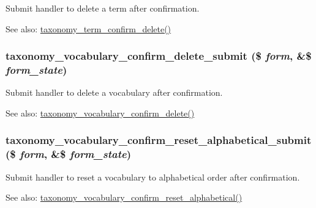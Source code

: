 Submit handler to delete a term after confirmation.

\begin{Desc}
\item[See also:]\hyperlink{group__forms_g409c50f3f4727ec2856079e7abb01eba}{taxonomy\_\-term\_\-confirm\_\-delete()} \end{Desc}
\hypertarget{taxonomy_8admin_8inc_37c587803cac8e509913d1374e897040}{
\subsubsection[{taxonomy\_\-vocabulary\_\-confirm\_\-delete\_\-submit}]{\setlength{\rightskip}{0pt plus 5cm}taxonomy\_\-vocabulary\_\-confirm\_\-delete\_\-submit (\$ {\em form}, \/  \&\$ {\em form\_\-state})}}
\label{taxonomy_8admin_8inc_37c587803cac8e509913d1374e897040}


Submit handler to delete a vocabulary after confirmation.

\begin{Desc}
\item[See also:]\hyperlink{group__forms_gc5c29e41ed1c0a05b4678e69aff1d947}{taxonomy\_\-vocabulary\_\-confirm\_\-delete()} \end{Desc}
\hypertarget{taxonomy_8admin_8inc_682c533b8249e033ce7e612550c9b68d}{
\subsubsection[{taxonomy\_\-vocabulary\_\-confirm\_\-reset\_\-alphabetical\_\-submit}]{\setlength{\rightskip}{0pt plus 5cm}taxonomy\_\-vocabulary\_\-confirm\_\-reset\_\-alphabetical\_\-submit (\$ {\em form}, \/  \&\$ {\em form\_\-state})}}
\label{taxonomy_8admin_8inc_682c533b8249e033ce7e612550c9b68d}


Submit handler to reset a vocabulary to alphabetical order after confirmation.

\begin{Desc}
\item[See also:]\hyperlink{group__forms_g439f9d499952ff3647ffe0c660d0bd65}{taxonomy\_\-vocabulary\_\-confirm\_\-reset\_\-alphabetical()} \end{Desc}
